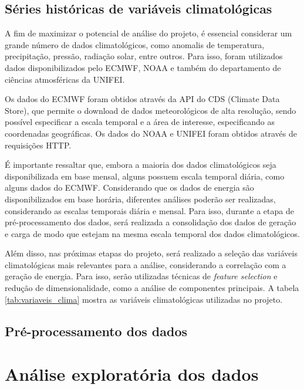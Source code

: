 \begin{figure}[!ht]
	{}
	{}
\end{figure}

\subsection{Séries históricas de variáveis climatológicas}
A fim de maximizar o potencial de análise do projeto, é essencial considerar um grande número de dados climatológicos, 
como anomalis de temperatura, precipitação, pressão, radiação solar, entre outros. Para isso, foram utilizados dados 
disponibilizados pelo ECMWF, NOAA e também do departamento de ciências atmosféricas da UNIFEI.

Os dados do ECMWF foram obtidos através da API do CDS (Climate Data Store), que permite o download de dados 
meteorológicos de alta resolução, sendo possível especificar a escala temporal e a área de interesse, especificando as 
coordenadas geográficas. Os dados do NOAA e UNIFEI foram obtidos através de requisições HTTP.

É importante ressaltar que, embora a maioria dos dados climatológicos seja disponibilizada em base mensal, alguns
possuem escala temporal diária, como alguns dados do ECMWF. Considerando que os dados de energia são disponibilizados em
base horária, diferentes análises poderão ser realizadas, considerando as escalas temporais diária e mensal. Para isso,
durante a etapa de pré-processamento dos dados, será realizada a consolidação dos dados de geração e carga de modo que
estejam na mesma escala temporal dos dados climatológicos.

Além disso, nas próximas etapas do projeto, será realizado a seleção das variáveis climatológicas mais relevantes para
a análise, considerando a correlação com a geração de energia. Para isso, serão utilizadas técnicas de \textit{feature
selection} e redução de dimensionalidade, como a análise de componentes principais. A tabela \ref{tab:variaveis_clima}
mostra as variáveis climatológicas utilizadas no projeto.

\subsection{Pré-processamento dos dados}


\section{Análise exploratória dos dados}


